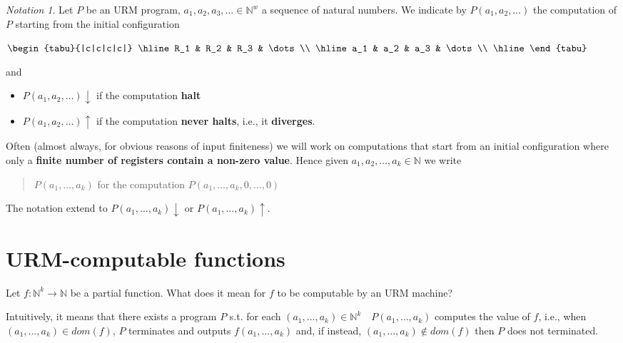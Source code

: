 \documentclass{amsbook}
\newcommand{\nat}{\ensuremath{\mathbb{N}}}
\newcommand{\dom}[1]{\ensuremath{\mathit{dom}({#1})}}
\theoremstyle{definition}
\theoremstyle{remark}
\newtheorem{notation}[theorem]{Notation}
\numberwithin{section}{chapter}
\numberwithin{equation}{chapter}
\begin{document}
\begin{notation}
  Let $P$ be an URM program, $a_1,a_2,a_3,\dots \in \nat^w$ a sequence
  of natural numbers. We indicate by $P(a_1,a_2,\dots)$ the
  computation of $P$ starting from the initial configuration
  
  \begin{center}
    $\begin{tabu}{|c|c|c|c|}
      \hline
      R_1 & R_2 & R_3 & \dots \\
      \hline
      a_1 & a_2 & a_3 & \dots \\
      \hline
    \end{tabu}$
  \end{center}
  
  and
  
  \begin{itemize}
  \item $P(a_1,a_2,\dots) \downarrow$ if the computation \textbf{halt}
  \item $P(a_1,a_2,\dots) \uparrow$ if the computation \textbf{never
      halts}, i.e., it \textbf{diverges}.
  \end{itemize}


  Often (almost always, for obvious reasons of input finiteness) we
  will work on computations that start from an initial configuration
  where only a \textbf{finite number of registers contain a non-zero
    value}. Hence given $a_1,a_2,\dots,a_k \in \nat$ we write
  \begin{quote}
    $P(a_1,\dots,a_k)$ for the computation
    $P(a_1,\dots,a_k,0,\dots,0)$
  \end{quote}
  The notation extend to $P(a_1,\dots,a_k)\downarrow$ or
  $P(a_1,\dots,a_k)\uparrow$.
\end{notation}

\section{URM-computable functions}
  
Let $f : \nat^k \rightarrow \nat$ be a partial function. What does it mean for  $f$ to be computable by an URM machine?

Intuitively, it means that there exists a program $P$ s.t. for each $(a_1,\dots,a_k) \in \nat^k \quad P(a_1,\dots,a_k)$ computes the value of $f$, i.e., when $(a_1,\dots,a_k)  \in \dom{f}$, $P$ terminates and outputs $f(a_1, \ldots, a_k)$ and, if instead, $(a_1,\dots,a_k)  \not\in \dom{f}$ then $P$ does not terminated.
\end{document}
